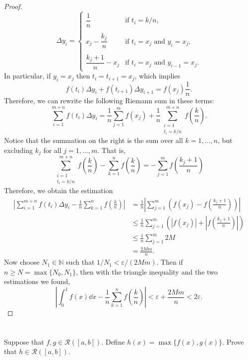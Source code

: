\documentclass[12pt]{article}
\newenvironment{problem}
    {\begin{lrbox}{\mybox}\begin{minipage}{0.98\textwidth}}
    {\end{minipage}\end{lrbox}\begin{center}\framebox[\textwidth]{\usebox{\mybox}}\end{center}}
\theoremstyle{definition}
\newcommand{\N}{\mathbb{N}}
\newcommand{\eps}{\varepsilon}
\begin{document}
\begin{proof}
    \[
        \Delta y_i = \begin{cases}
            \dfrac1n &\text{if $t_i = k/n$,} \\\\
            x_j - \dfrac{k_j}{n} &\text{if $t_i = x_j$ and $y_i = x_j$,} \\\\
            \dfrac{k_j + 1}{n} - x_j &\text{if $t_i = x_j$ and $y_{i-1} = x_j$.}
        \end{cases}
    \]
    In particular, if $y_i = x_j$ then $t_i = t_{i+1} = x_j$, which implies
    \[
        f(t_i)\Delta y_i + f(t_{i+1})\Delta y_{i+1} = f(x_j)\frac1n.
    \]
    Therefore, we can rewrite the following Riemann sum in these terms:
    \[
        \sum_{i=1}^{m+n} f(t_i) \Delta y_i
            = \frac1n\sum_{j=1}^m f(x_j)
            + \frac1n\sum_{\substack{i = 1 \\ t_i = k/n}}^{m+n} f\left(\frac{k}{n}\right).
    \]
    Notice that the summation on the right is the sum over all $k = 1, \dots, n$, but excluding $k_j$ for all $j = 1, \dots, m$. That is,
    \[
        \sum_{\substack{i = 1 \\ t_i = k/n}}^{m+n} f\left(\frac{k}{n}\right) - \sum_{k=1}^n f\left (\frac{k}{n}\right)
         = -\sum_{j=1}^{m} f\left(\frac{k_j + 1}{n}\right)
    \]
    Therefore, we obtain the estimation
    \begin{align*}
        \left| \sum_{i=1}^{m+n} f(t_i) \Delta y_i - \frac{1}{n}\sum_{k=1}^n f\left (\frac{k}{n}\right)\right|
            &= \frac1n\left|\sum_{j=1}^m \left(f(x_j) - f\left(\frac{k_j + 1}{n}\right)\right)\right| \\
            &\leq \frac1n\sum_{j=1}^m \left(\left|f(x_j)\right| + \left|f\left(\frac{k_j + 1}{n}\right)\right|\right) \\
            &\leq  \frac1n\sum_{j=1}^m 2M \\
            &= \frac{2Mm}{n}.
    \end{align*}
    Now choose $N_1 \in \N$ such that $1/N_1 < \eps/(2Mm)$. Then if $n \geq N = \max\{N_0, N_1\}$, then with the triangle inequality and the two estimations we found,
    \[
        \left| \int_0^1 f(x)  \dd{x} - \frac{1}{n}\sum_{k=1}^n f\left (\frac{k}{n}\right) \right|
            < \eps + \frac{2Mm}{n}
            < 2\eps.
    \]
    

\end{proof}

\section{}
\begin{problem}
    Suppose that $f,g\in \mathcal{R}([a,b])$. Define $h(x) = \max \{f(x),g(x)\}$. Prove that $h \in \mathcal{R}([a,b])$.
\end{problem}
\end{document}

